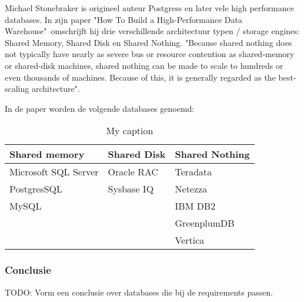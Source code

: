 Michael Stonebraker is origineel auteur Postgress en later vele high performance databases. In zijn paper "How To Build a High-Performance Data Warehouse"\  omschrijft hij drie verschillende architectuur typen / storage engines: Shared Memory, Shared Disk en Shared Nothing.
"Because shared nothing does not typically have nearly as severe bus or resource contention as shared-memory or shared-disk machines, shared nothing can be made to scale to hundreds or even thousands
of machines. Because of this, it is generally regarded as the best-scaling architecture". \parencite{dewitt2006build}



In de paper worden de volgende databases genoemd:
\begin{table}[bh]
\centering
\caption{My caption}
\label{my-label}
\begin{tabular}{|l|l|l|}
\hline
\textbf{Shared memory} & \textbf{Shared Disk} & \textbf{Shared Nothing} \\ \hline
Microsoft SQL Server   & Oracle RAC           & Teradata \\
\hline
PostgresSQL            & Sysbase IQ           & Netezza \\
\hline
MySQL                  &                      & IBM DB2 \\
\hline
                       &                      & GreenplumDB \\
\hline
                       &                      & Vertica \\
\hline
\end{tabular}
\end{table}

\subsubsection{\textbf{Conclusie}}

TODO: Vorm een conclusie over databases die bij de requirements passen.